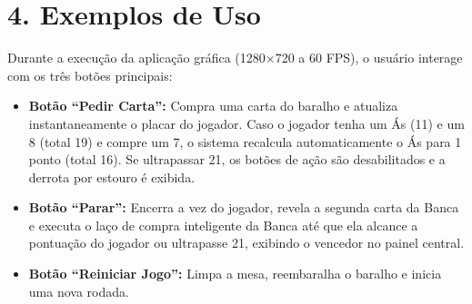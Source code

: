 \documentclass[10pt,a4paper]{article}
\begin{document}
\section*{4. Exemplos de Uso}

Durante a execução da aplicação gráfica (1280$\times$720 a 60 FPS), o usuário interage com os três botões principais:
\begin{itemize}
    \item \textbf{Botão ``Pedir Carta'':} Compra uma carta do baralho e atualiza instantaneamente o placar do jogador. Caso o jogador tenha um Ás (11) e um 8 (total 19) e compre um 7, o sistema recalcula automaticamente o Ás para 1 ponto (total 16). Se ultrapassar 21, os botões de ação são desabilitados e a derrota por estouro é exibida.
    \item \textbf{Botão ``Parar'':} Encerra a vez do jogador, revela a segunda carta da Banca e executa o laço de compra inteligente da Banca até que ela alcance a pontuação do jogador ou ultrapasse 21, exibindo o vencedor no painel central.
    \item \textbf{Botão ``Reiniciar Jogo'':} Limpa a mesa, reembaralha o baralho e inicia uma nova rodada.
\end{itemize}
\end{document}
